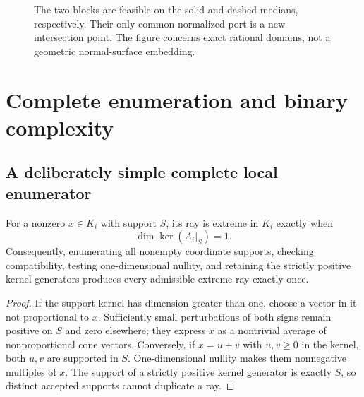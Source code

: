 \begin{figure}[ht]
\centering
{}
\caption{The two blocks are feasible on the solid and dashed medians, respectively. Their only common normalized port is a new intersection point. The figure concerns exact rational domains, not a geometric normal-surface embedding.}
\end{figure}

\section{Complete enumeration and binary complexity}
\label{sec:complexity}

\subsection{A deliberately simple complete local enumerator}
\begin{proposition}
\label{prop:support}
For a nonzero $x\in K_i$ with support $S$, its ray is extreme in $K_i$ exactly when
\[
 \dim\ker(A_i|_S)=1.
\]
Consequently, enumerating all nonempty coordinate supports, checking compatibility, testing one-dimensional nullity, and retaining the strictly positive kernel generators produces every admissible extreme ray exactly once.
\end{proposition}
\begin{proof}
If the support kernel has dimension greater than one, choose a vector in it not proportional to $x$. Sufficiently small perturbations of both signs remain positive on $S$ and zero elsewhere; they express $x$ as a nontrivial average of nonproportional cone vectors. Conversely, if $x=u+v$ with $u,v\ge0$ in the kernel, both $u,v$ are supported in $S$. One-dimensional nullity makes them nonnegative multiples of $x$. The support of a strictly positive kernel generator is exactly $S$, so distinct accepted supports cannot duplicate a ray.
\end{proof}

